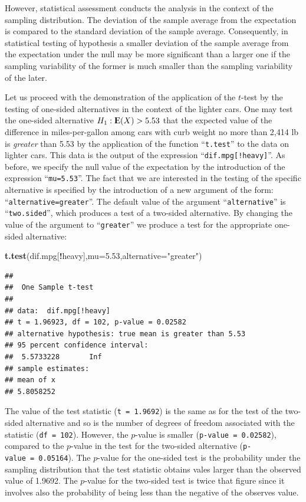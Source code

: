 \documentclass[]{krantz}
\makeatletter
\newenvironment{Shaded}{\begin{snugshade}}{\end{snugshade}}
\newcommand{\KeywordTok}[1]{\textcolor[rgb]{0.13,0.29,0.53}{\textbf{#1}}}
\newcommand{\DataTypeTok}[1]{\textcolor[rgb]{0.13,0.29,0.53}{#1}}
\newcommand{\FloatTok}[1]{\textcolor[rgb]{0.00,0.00,0.81}{#1}}
\newcommand{\StringTok}[1]{\textcolor[rgb]{0.31,0.60,0.02}{#1}}
\newcommand{\OperatorTok}[1]{\textcolor[rgb]{0.81,0.36,0.00}{\textbf{#1}}}
\newcommand{\NormalTok}[1]{#1}
\newcommand{\Expec}{{\rm I\kern-.3em E}}
\newenvironment{kframe}{%
\medskip{}
\setlength{\fboxsep}{.8em}
 \def\at@end@of@kframe{}%
 \ifinner\ifhmode%
  \def\at@end@of@kframe{\end{minipage}}%
  \begin{minipage}{\columnwidth}%
 \fi\fi%
 \def\FrameCommand##1{\hskip\@totalleftmargin \hskip-\fboxsep
 \colorbox{shadecolor}{##1}\hskip-\fboxsep
     \hskip-\linewidth \hskip-\@totalleftmargin \hskip\columnwidth}%
 \MakeFramed {\advance\hsize-\width
   \@totalleftmargin\z@ \linewidth\hsize
   \@setminipage}}%
 {\par\unskip\endMakeFramed%
 \at@end@of@kframe}
\renewenvironment{Shaded}{\begin{kframe}}{\end{kframe}}
\theoremstyle{definition}
\theoremstyle{definition}
\theoremstyle{definition}
\theoremstyle{remark}
\makeatother
\begin{document}
However, statistical assessment conducts the analysis in the context of
the sampling distribution. The deviation of the sample average from the
expectation is compared to the standard deviation of the sample average.
Consequently, in statistical testing of hypothesis a smaller deviation
of the sample average from the expectation under the null may be more
significant than a larger one if the sampling variability of the former
is much smaller than the sampling variability of the later.

Let us proceed with the demonstration of the application of the
\(t\)-test by the testing of one-sided alternatives in the context of
the lighter cars. One may test the one-sided alternative
\(H_1:\Expec(X) > 5.53\) that the expected value of the difference in
miles-per-gallon among cars with curb weight no more than 2,414 lb is
\emph{greater} than 5.53 by the application of the function
``\texttt{t.test}'' to the data on lighter cars. This data is the output
of the expression ``\texttt{dif.mpg{[}!heavy{]}}''. As before, we
specify the null value of the expectation by the introduction of the
expression ``\texttt{mu=5.53}''. The fact that we are interested in the
testing of the specific alternative is specified by the introduction of
a new argument of the form: ``\texttt{alternative=greater}''. The
default value of the argument ``\texttt{alternative}'' is
``\texttt{two.sided}'', which produces a test of a two-sided
alternative. By changing the value of the argument to
``\texttt{greater}'' we produce a test for the appropriate one-sided
alternative:

\begin{Shaded}
\begin{Highlighting}[]
\KeywordTok{t.test}\NormalTok{(dif.mpg[}\OperatorTok{!}\NormalTok{heavy],}\DataTypeTok{mu=}\FloatTok{5.53}\NormalTok{,}\DataTypeTok{alternative=}\StringTok{"greater"}\NormalTok{)}
\end{Highlighting}
\end{Shaded}

\begin{verbatim}
## 
##  One Sample t-test
## 
## data:  dif.mpg[!heavy]
## t = 1.96923, df = 102, p-value = 0.02582
## alternative hypothesis: true mean is greater than 5.53
## 95 percent confidence interval:
##  5.5733228       Inf
## sample estimates:
## mean of x 
## 5.8058252
\end{verbatim}

The value of the test statistic (\texttt{t\ =\ 1.9692}) is the same as
for the test of the two-sided alternative and so is the number of
degrees of freedom associated with the statistic (\texttt{df\ =\ 102}).
However, the \(p\)-value is smaller (\texttt{p-value\ =\ 0.02582}),
compared to the \(p\)-value in the test for the two-sided alternative
(\texttt{p-value\ =\ 0.05164}). The \(p\)-value for the one-sided test
is the probability under the sampling distribution that the test
statistic obtains vales larger than the observed value of 1.9692. The
\(p\)-value for the two-sided test is twice that figure since it
involves also the probability of being less than the negative of the
observes value.
\end{document}
